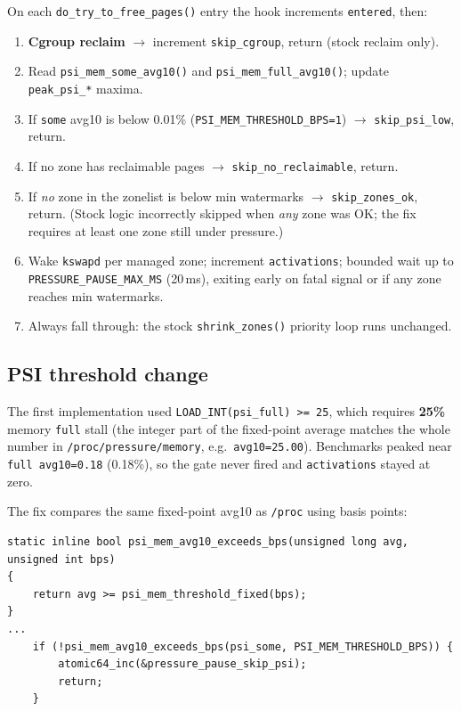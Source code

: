 \documentclass[12pt,a4paper]{article}
\begin{document}
On each \texttt{do\_try\_to\_free\_pages()} entry the hook increments \texttt{entered}, then:
\begin{enumerate}[leftmargin=1.2cm]
    \item \textbf{Cgroup reclaim} $\rightarrow$ increment \texttt{skip\_cgroup}, return (stock reclaim only).
    \item Read \texttt{psi\_mem\_some\_avg10()} and \texttt{psi\_mem\_full\_avg10()}; update \texttt{peak\_psi\_*} maxima.
    \item If \texttt{some} avg10 is below 0.01\% (\texttt{PSI\_MEM\_THRESHOLD\_BPS=1}) $\rightarrow$ \texttt{skip\_psi\_low}, return.
    \item If no zone has reclaimable pages $\rightarrow$ \texttt{skip\_no\_reclaimable}, return.
    \item If \emph{no} zone in the zonelist is below min watermarks $\rightarrow$ \texttt{skip\_zones\_ok}, return. (Stock logic incorrectly skipped when \emph{any} zone was OK; the fix requires at least one zone still under pressure.)
    \item Wake \texttt{kswapd} per managed zone; increment \texttt{activations}; bounded wait up to \texttt{PRESSURE\_PAUSE\_MAX\_MS} (20\,ms), exiting early on fatal signal or if any zone reaches min watermarks.
    \item Always fall through: the stock \texttt{shrink\_zones()} priority loop runs unchanged.
\end{enumerate}

\subsection{PSI threshold change}

The first implementation used \texttt{LOAD\_INT(psi\_full) >= 25}, which requires \textbf{25\%} memory \texttt{full} stall (the integer part of the fixed-point average matches the whole number in \texttt{/proc/pressure/memory}, e.g.\ \texttt{avg10=25.00}). Benchmarks peaked near \texttt{full avg10=0.18} (0.18\%), so the gate never fired and \texttt{activations} stayed at zero.

The fix compares the same fixed-point avg10 as \texttt{/proc} using basis points:

\begin{codebox}
\begin{lstlisting}[style=cstyle]
static inline bool psi_mem_avg10_exceeds_bps(unsigned long avg, unsigned int bps)
{
	return avg >= psi_mem_threshold_fixed(bps);
}
...
	if (!psi_mem_avg10_exceeds_bps(psi_some, PSI_MEM_THRESHOLD_BPS)) {
		atomic64_inc(&pressure_pause_skip_psi);
		return;
	}
\end{lstlisting}
\end{codebox}
\end{document}
